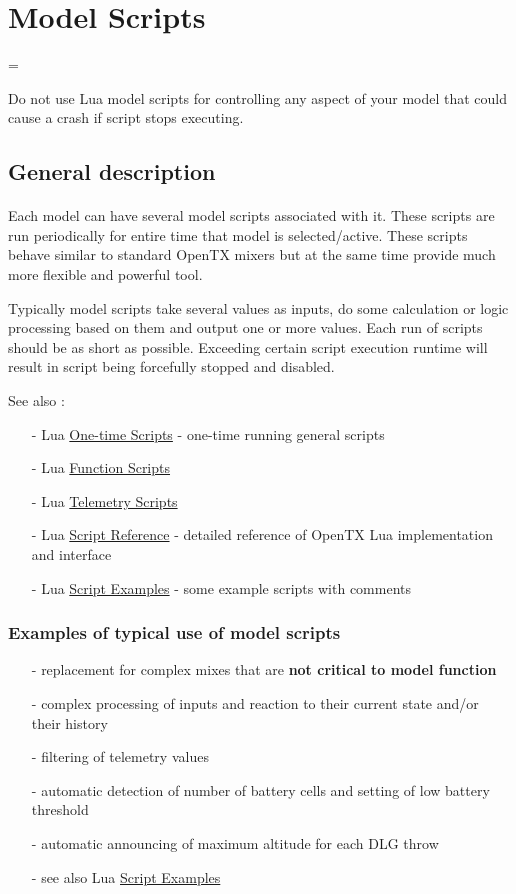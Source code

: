\documentclass[a4paper,french,10pt]{article}
\newenvironment{warning}
  {\par\begin{mdframed}[linewidth=2pt,linecolor=red]%
    \begin{list}{}{\leftmargin=1cm
                   \labelwidth=\leftmargin}\item[\color{red}\Large\ding{53}]}
  {\end{list}\end{mdframed}\par}
\begin{document}
\section{Model Scripts}

\begin{warning}
Do not use Lua model scripts for controlling any aspect of your model that could cause a crash if script stops executing.
\end{warning}

\subsection{General description}
\paragraph{}
Each model can have several model scripts associated with it. These scripts are run periodically for entire time that model is selected/active. These scripts behave similar to standard OpenTX mixers but at the same time provide much more flexible and powerful tool.


Typically model scripts take several values as inputs, do some calculation or logic processing based on them and output one or more values. Each run of scripts should be as short as possible. Exceeding certain script execution runtime will result in script being forcefully stopped and disabled.

See also :
\begin{itemize}[leftmargin=*,itemsep=5mm,nolistsep]
\item[-] Lua \href{dunno}{One-time Scripts}  - one-time running general scripts
\item[-] Lua \href{dunno}{Function Scripts}
\item[-] Lua \href{dunno}{Telemetry Scripts}
\item[-] Lua \href{dunno}{Script Reference}  - detailed reference of OpenTX Lua implementation and interface
\item[-] Lua \href{dunno}{Script Examples}  - some example scripts with comments
\end{itemize}

\subsubsection*{Examples of typical use of model scripts}

\begin{itemize}[leftmargin=*, itemsep=5mm,nolistsep]
\item[-] replacement for complex mixes that are \textbf{not critical to model function}
\item[-] complex processing of inputs and reaction to their current state and/or their history
\item[-] filtering of telemetry values
\item[-] automatic detection of number of battery cells and setting of low battery threshold
\item[-] automatic announcing of maximum altitude for each DLG throw
\item[-] see also Lua \href{dunno}{Script Examples}
\end{itemize}
\end{document}
